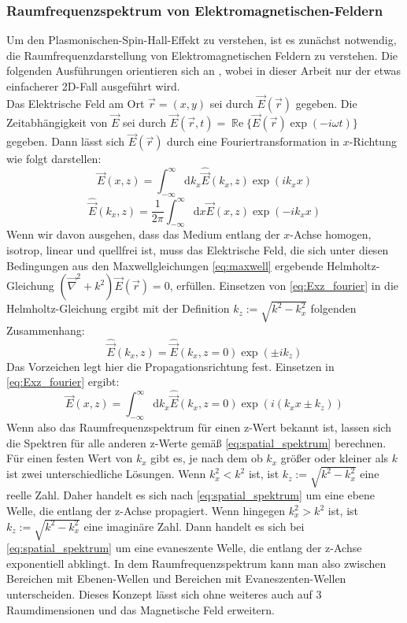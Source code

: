 \documentclass{article}
\begin{document}
	\subsubsection{Raumfrequenzspektrum von Elektromagnetischen-Feldern}
		Um den Plasmonischen-Spin-Hall-Effekt zu verstehen, ist es zunächst notwendig, die Raumfrequenzdarstellung von Elektromagnetischen Feldern zu verstehen. Die folgenden Ausführungen orientieren sich an \cite{Novotny.2012b}, wobei in dieser Arbeit nur der etwas einfacherer 2D-Fall ausgeführt wird.\\		
		Das Elektrische Feld am Ort $\vec{r} = (x, y) $ sei durch $\vec{E}({\vec{r}})$ gegeben.
		Die Zeitabhängigkeit von $\vec{E}$ sei durch $\vec{E}({\vec{r}, t})=\operatorname{\mathbb{R}e}\{\vec{E}({\vec{r}})\exp(-i\omega t)\}$ gegeben. Dann lässt sich $\vec{E}({\vec{r}})$ durch eine Fouriertransformation in $x$-Richtung wie folgt darstellen:
		\begin{equation}
			\label{eq:Exz_fourier}
			\vec{E}(x,z) = \int_{-\infty}^{\infty}\mathrm{d}{k_x}\hat{\vec{E}}(k_x,z)\exp(ik_xx)				
		\end{equation}
		\begin{equation}
			\label{eq:EKxz_fourier}
			\hat{\vec{E}}(k_x,z) = \dfrac{1}{2\pi}\int_{-\infty}^{\infty}\mathrm{d}x\vec{E}(x,z)\exp(-ik_xx)
		\end{equation}
		Wenn wir davon ausgehen, dass das Medium entlang der $x$-Achse homogen, isotrop, linear und quellfrei ist, muss das Elektrische Feld, die sich unter diesen Bedingungen aus den Maxwellgleichungen \eqref{eq:maxwell} ergebende Helmholtz-Gleichung $(\vec{\nabla}^2+k^2)\vec{E}({\vec{r}}) = 0$, erfüllen. Einsetzen von \eqref{eq:Exz_fourier} in die Helmholtz-Gleichung ergibt mit der Definition $k_z := \sqrt{k^2-k_x^2}$ folgenden Zusammenhang:
		\begin{equation}
			\label{eq:spatial_spektrum}
		\hat{\vec{E}}(k_x,z) =\hat{\vec{E}}(k_x,z= 0) \exp(\pm ik_ z)
		\end{equation}
	Das Vorzeichen legt hier die Propagationsrichtung fest.
	Einsetzen in \eqref{eq:Exz_fourier} ergibt:
		\begin{equation}
			\label{eq:Espatial_spektrum}
			\vec{E}(x,z) = \int_{-\infty}^{\infty}\mathrm{d}{k_x}\hat{\vec{E}}(k_x,z= 0)\exp(i(k_xx\pm k_ z))
		\end{equation}
	Wenn also das Raumfrequenzspektrum für einen z-Wert bekannt ist, lassen sich die Spektren für alle anderen z-Werte gemäß \eqref{eq:spatial_spektrum} berechnen. Für einen festen Wert von $k_x$ gibt es, je nach dem ob $k_x$ größer oder kleiner als $k$ ist zwei unterschiedliche Lösungen. Wenn $k_x^2 < k^2$ ist, ist $k_z := \sqrt{k^2-k_x^2}$ eine reelle Zahl. Daher handelt es sich nach \eqref{eq:spatial_spektrum} um eine ebene Welle, die entlang der z-Achse propagiert.
	Wenn hingegen $k_x^2 > k^2$ ist, ist $k_z := \sqrt{k^2-k_x^2}$ eine imaginäre Zahl. Dann handelt es sich bei \eqref{eq:spatial_spektrum} um eine evaneszente Welle, die entlang der z-Achse exponentiell abklingt. In dem Raumfrequenzspektrum kann man also zwischen Bereichen mit Ebenen-Wellen und  Bereichen mit Evaneszenten-Wellen unterscheiden. Dieses Konzept lässt sich ohne weiteres auch auf 3 Raumdimensionen und das Magnetische Feld erweitern.
\end{document}
